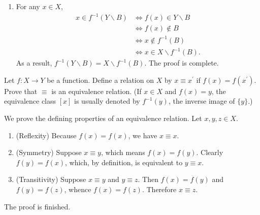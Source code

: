 \begin{questions}
\begin{theproof}
\begin{enumerate}[label=(\alph*)]
    \item For any  \(x\in X\),
    \begin{align*}
        x \in f^{-1} (Y \backslash B) & \iff f(x) \in Y \backslash B \\
        & \iff f(x) \not \in B \\
        & \iff x \not \in f^{-1} (B) \\
        & \iff x \in X \backslash f^{-1} (B).
    \end{align*}
    As a result, \(f^{-1} (Y \backslash B) = X \backslash f^{-1} (B)\). The proof is complete.
        
\end{enumerate}    
\end{theproof}


\question
    Let \(f: X \rightarrow Y\) be a function. Define a relation on \(X\) by \(x \equiv x^{\prime}\) if \(f(x)=f\left(x^{\prime}\right)\). Prove that \(\equiv\) is an equivalence relation. (If \(x \in X\) and \(f(x)=y\), the equivalence class \([x]\) is usually denoted by \(f^{-1}(y)\), the inverse image of \(\{y\}\).)

\begin{theproof} We prove the defining properties of an equivalence relation. Let \(x,y,z\in X\).
\begin{enumerate}[label=(\roman*)]
    \item (Reflexity) Because   \(f(x) = f(x)\), we have  \(x\equiv x\).
    \item (Symmetry) Suppose \(x\equiv y\), which means \(f(x) = f(y)\). Clearly \(f(y) = f(x)\), which, by definition, is equivalent to  \(y\equiv x\).
    \item (Transitivity) Suppose \(x\equiv y\) and \(y\equiv z\). Then \(f(x) = f(y)\) and \(f(y) = f(z)\), whence \(f(x) = f(z)\). Therefore \(x\equiv z\).
\end{enumerate}
    The proof is finished.
\end{theproof}
\end{questions}